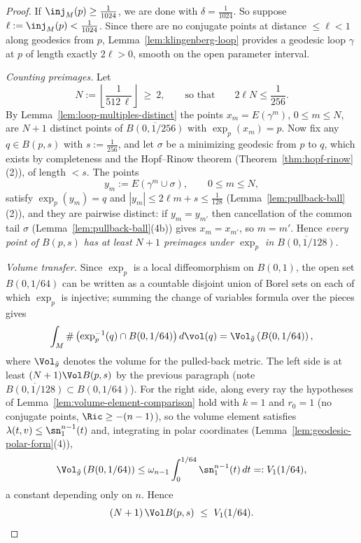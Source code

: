 \begin{proof}
If $\inj_M(p)\ge\tfrac{1}{1024}$, we are done with
$\delta=\tfrac1{1024}$. So suppose
$\ell:=\inj_M(p)<\tfrac1{1024}$. Since there are no conjugate
points at distance $\le\ell<1$ along geodesics from $p$,
Lemma~\ref{lem:klingenberg-loop} provides a geodesic loop $\gamma$
at $p$ of length exactly $2\ell>0$, smooth on the open parameter
interval.

\emph{Counting preimages.} Let
$$N:=\left\lfloor\frac{1}{512\,\ell}\right\rfloor\ \ge\ 2,
\qquad\text{so that}\qquad 2\ell N\le\frac{1}{256}.$$
By Lemma~\ref{lem:loop-multiples-distinct} the points
$x_m=E(\gamma^m)$, $0\le m\le N$, are $N+1$ distinct points of
$\overline{B(0,1/256)}$ with $\exp_p(x_m)=p$. Now fix any
$q\in B(p,s)$ with $s:=\tfrac1{256}$, and let $\sigma$ be a
minimizing geodesic from $p$ to $q$, which exists by completeness
and the Hopf--Rinow theorem (Theorem~\ref{thm:hopf-rinow}(2)),
of length $<s$. The points
$$y_m:=E\left(\gamma^m\cup\sigma\right),\qquad 0\le m\le N,$$
satisfy $\exp_p(y_m)=q$ and $|y_m|\le2\ell m+s\le\tfrac1{128}$
(Lemma~\ref{lem:pullback-ball}(2)), and they are pairwise
distinct: if $y_m=y_{m'}$ then cancellation of the common tail
$\sigma$ (Lemma~\ref{lem:pullback-ball}(4b)) gives
$x_m=x_{m'}$, so $m=m'$. Hence \emph{every point of $B(p,s)$ has
at least $N+1$ preimages under $\exp_p$ in
$\overline{B(0,1/128)}$}.

\emph{Volume transfer.} Since $\exp_p$ is a local
diffeomorphism on $B(0,1)$, the open set $B(0,1/64)$ can be written
as a countable disjoint union of Borel sets on each of which
$\exp_p$ is injective; summing the change of variables formula
over the pieces gives
$$\int_M\#\left(\exp_p^{-1}(q)\cap
B(0,1/64)\right)d\vol(q)
=\Vol_{\tilde g}\left(B(0,1/64)\right),$$
where $\Vol_{\tilde g}$ denotes the volume for the pulled-back
metric. The left side is at least $(N+1)\Vol B(p,s)$ by the
previous paragraph (note $\overline{B(0,1/128)}\subset B(0,1/64)$).
For the right side, along every ray the hypotheses of
Lemma~\ref{lem:volume-element-comparison} hold with $k=1$ and
$r_0=1$ (no conjugate points, $\Ric\ge-(n-1)$), so the volume
element satisfies $\lambda(t,v)\le\sn_1^{n-1}(t)$ and, integrating
in polar coordinates (Lemma~\ref{lem:geodesic-polar-form}(4)),
$$\Vol_{\tilde g}\left(B(0,1/64)\right)
\le\omega_{n-1}\int_0^{1/64}\sn_1^{n-1}(t)\,dt=:V_1(1/64),$$
a constant depending only on $n$. Hence
\begin{equation}\label{volinjcount}
(N+1)\,\Vol B(p,s)\ \le\ V_1(1/64).
\end{equation}


\end{proof}
